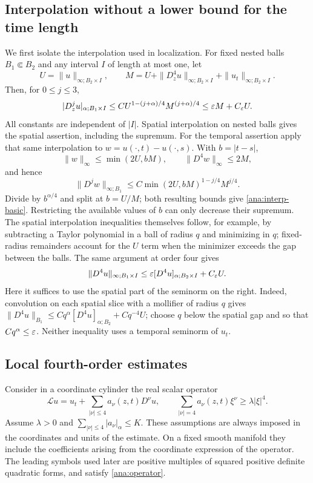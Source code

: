 \subsection{Interpolation without a lower bound for the time length}

We first isolate the interpolation used in localization.  For fixed
nested balls $B_1\Subset B_2$ and any interval $I$ of length at most
one, let
\[
 U=\|u\|_{\infty;B_2\times I},\qquad
 M=U+\|D_z^4u\|_{\infty;B_2\times I}
       +\|u_t\|_{\infty;B_2\times I}.
\]
Then, for $0\le j\le3$,
\begin{equation}\label{ana:interp-basic}
 |D_z^ju|_{\alpha;B_1\times I}
 \le C U^{1-(j+\alpha)/4}M^{(j+\alpha)/4}
 \le \varepsilon M+C_\varepsilon U.
\end{equation}
All constants are independent of $|I|$.  Spatial interpolation on
nested balls gives the spatial assertion, including the supremum.
For the temporal assertion apply that same interpolation to
$w=u(\cdot,t)-u(\cdot,s)$.  With $b=|t-s|$,
\[
 \|w\|_\infty\le\min(2U,bM),\qquad
 \|D^4w\|_\infty\le2M,
\]
and hence
\[
 \|D^jw\|_{\infty;B_1}
 \le C\min(2U,bM)^{1-j/4}M^{j/4}.
\]
Divide by $b^{\alpha/4}$ and split at $b=U/M$; both resulting
bounds give \eqref{ana:interp-basic}.  Restricting the available values
of $b$ can only decrease their supremum.  The spatial interpolation
inequalities themselves follow, for example, by subtracting a
Taylor polynomial in a ball of radius $q$ and minimizing in $q$;
fixed-radius remainders account for the $U$ term when the minimizer
exceeds the gap between the balls.  The same argument at order four
gives
\begin{equation}\label{ana:fourth-sup-interp}
 \|D^4u\|_{\infty;B_1\times I}
 \le\varepsilon[D^4u]_{\alpha;B_2\times I}+C_\varepsilon U.
\end{equation}
Here it suffices to use the spatial part of the seminorm on the
right.  Indeed, convolution on each spatial slice with a mollifier
of radius $q$ gives
$\|D^4u\|_{B_1}\le Cq^\alpha[D^4u]_{\alpha;B_2}
 +Cq^{-4}U$; choose $q$ below the spatial gap and so that
$Cq^\alpha\le\varepsilon$.  Neither inequality uses a temporal seminorm
of $u_t$.

\subsection{Local fourth-order estimates}

Consider in a coordinate cylinder the real scalar operator
\begin{equation}\label{ana:operator}
 \mathcal L u=u_t+\sum_{|\nu|\le4}a_\nu(z,t)D^\nu u,
 \qquad
 \sum_{|\nu|=4}a_\nu(z,t)\xi^\nu\ge\lambda|\xi|^4.
\end{equation}
Assume $\lambda>0$ and $\sum_{|\nu|\le4}|a_\nu|_\alpha\le K$.
These assumptions are always imposed in the coordinates and units
of the estimate.  On a fixed smooth manifold they include the
coefficients arising from the coordinate expression of the operator.
The leading symbols used later are positive multiples of squared
positive definite quadratic forms, and satisfy \eqref{ana:operator}.

